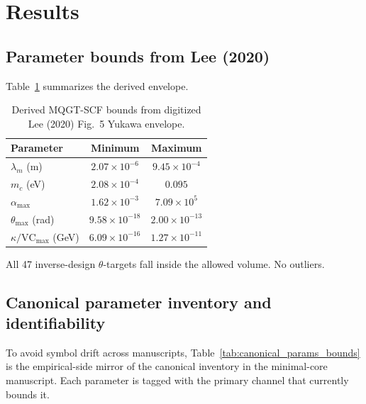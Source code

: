 \documentclass[reprint,amsmath,amssymb,aps,showkeys]{revtex4-2}
\begin{document}
\section{Results}
\subsection{Parameter bounds from Lee (2020)}
Table~\ref{tab:lee_bounds} summarizes the derived envelope.

\begin{table}[h]
\caption{Derived MQGT-SCF bounds from digitized Lee (2020) Fig.~5 Yukawa envelope.}
\label{tab:lee_bounds}
\begin{tabular}{lcc}
\toprule
Parameter & Minimum & Maximum \\
\midrule
$\lambda_m$ (m)          & $2.07\times10^{-6}$ & $9.45\times10^{-4}$ \\
$m_c$ (eV)               & $2.08\times10^{-4}$ & $0.095$ \\
$\alpha_\text{max}$      & $1.62\times10^{-3}$ & $7.09\times10^{5}$ \\
$\theta_\text{max}$ (rad) & $9.58\times10^{-18}$ & $2.00\times10^{-13}$ \\
$\kappa/\text{VC}_\text{max}$ (GeV) & $6.09\times10^{-16}$ & $1.27\times10^{-11}$ \\
\bottomrule
\end{tabular}
\end{table}

All 47 inverse-design $\theta$-targets fall inside the allowed volume. No outliers.

\subsection{Canonical parameter inventory and identifiability}
To avoid symbol drift across manuscripts, Table~\ref{tab:canonical_params_bounds} is the empirical-side mirror
of the canonical inventory in the minimal-core manuscript. Each parameter is tagged with the primary channel
that currently bounds it.
\end{document}
